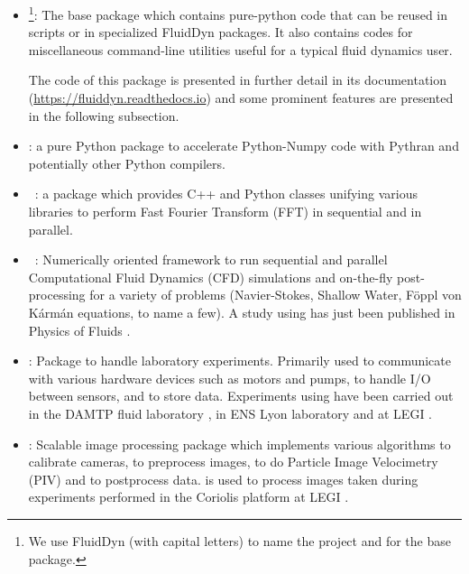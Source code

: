 \begin{itemize}
\item {}\footnote{We use FluidDyn (with capital letters) to name the
project and \fluiddyn for the base package.}: The base package which contains
pure-python code that can be reused in scripts or in specialized FluidDyn
packages. It also contains codes for miscellaneous command-line utilities useful
for a typical fluid dynamics user.

The code of this package is presented in further detail in its documentation
(\url{https://fluiddyn.readthedocs.io}) and some prominent features are presented
in the following subsection.

\item {}: a pure Python package to accelerate Python-Numpy code
with Pythran and potentially other Python compilers.

\item {}~\cite[see the companion paper][]{fluidfft}: a package which
provides C++ and Python classes unifying various libraries to perform Fast Fourier
Transform (FFT) in sequential and in parallel.

\item {}~\cite[see the companion paper][]{fluidsim}: Numerically
oriented framework to run sequential and parallel Computational Fluid Dynamics
(CFD) simulations and on-the-fly post-processing for a variety of problems
(Navier-Stokes, Shallow Water, F\"oppl von K\'arm\'an equations, to name a few).
A study using  has just been published in Physics of Fluids
\cite[]{LindborgMohanan2017}.

\item {}: Package to handle laboratory experiments. Primarily used to
communicate with various hardware devices such as motors and pumps, to handle I/O
between sensors, and to store data.
%
Experiments using  have been carried out in the DAMTP fluid
laboratory \cite[Cambridge,
UK. cf.][]{LeclercqPartridgeAugierDalzielKerswell2016}, in ENS Lyon laboratory
\cite[Lyon, France,][]{salort2018} and at LEGI \cite[Grenoble,
France,][]{ISSF2016}.

\item {}: Scalable image processing package which implements
various algorithms to calibrate cameras, to preprocess images, to do Particle
Image Velocimetry (PIV) and to postprocess data.
%
 is used to process images taken during experiments performed in the
Coriolis platform at LEGI \cite[]{ISSF2016}.


\end{itemize}
